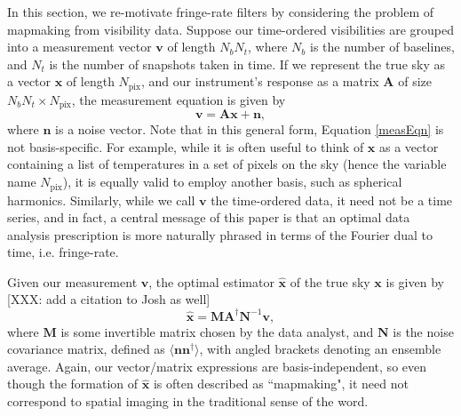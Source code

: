 \documentclass[twocolumn,apj,numberedappendix]{emulateapj}
\newcommand{\vis}{\mathbf{v}}
\newcommand{\x}{\mathbf{x}}
\newcommand{\xhat}{\hat{\mathbf{x}}}
\newcommand{\A}{\mathbf{A}}
\newcommand{\N}{\mathbf{N}}
\begin{document}

In this section, we re-motivate fringe-rate filters by
considering the problem of mapmaking from visibility data.  
Suppose our time-ordered visibilities are grouped into a measurement vector
$\vis$ of length $N_b N_t$, where $N_b$ is the number of baselines, and $N_t$
is the number of snapshots taken in time.  If we represent the true sky as a
vector $\x$ of length $N_\textrm{pix}$, and our instrument's response as a
matrix $\A$ of size $N_b N_t \times N_\textrm{pix}$, the measurement equation
is given by
\begin{equation}
\label{measEqn}
\vis = \A \x + \mathbf{n},
\end{equation}
where $\mathbf{n}$ is a noise vector.  Note that in this general form, Equation
\eqref{measEqn} is not basis-specific.  For example, while it is often useful
to think of $\x$ as a vector containing a list of temperatures in a set of
pixels on the sky (hence the variable name $N_\textrm{pix}$), it is equally
valid to employ another basis, such as spherical harmonics.  Similarly, while
we call $\vis$ the time-ordered data, it need not be a time series, and in
fact, a central message of this paper is that an optimal data analysis
prescription is more naturally phrased in terms of the Fourier dual to time,
i.e. fringe-rate.

Given our measurement $\vis$, the optimal estimator $\xhat$ of the true sky
$\x$ is given by \citep{Tegmark97,Morales2009} [XXX: add a citation to Josh
as well]
\begin{equation}
\label{optEst}
\xhat = \mathbf{M} \A^\dagger \N^{-1} \vis,
\end{equation}
where $\mathbf{M}$ is some invertible matrix chosen by the data analyst, and
$\N$ is the noise covariance matrix, defined as $\langle \mathbf{n}
\mathbf{n}^\dagger \rangle$, with angled brackets denoting an ensemble average.
Again, our vector/matrix expressions are basis-independent, so even though the
formation of $\xhat$ is often described as ``mapmaking", it need not correspond
to spatial imaging in the traditional sense of the word.
\end{document}
